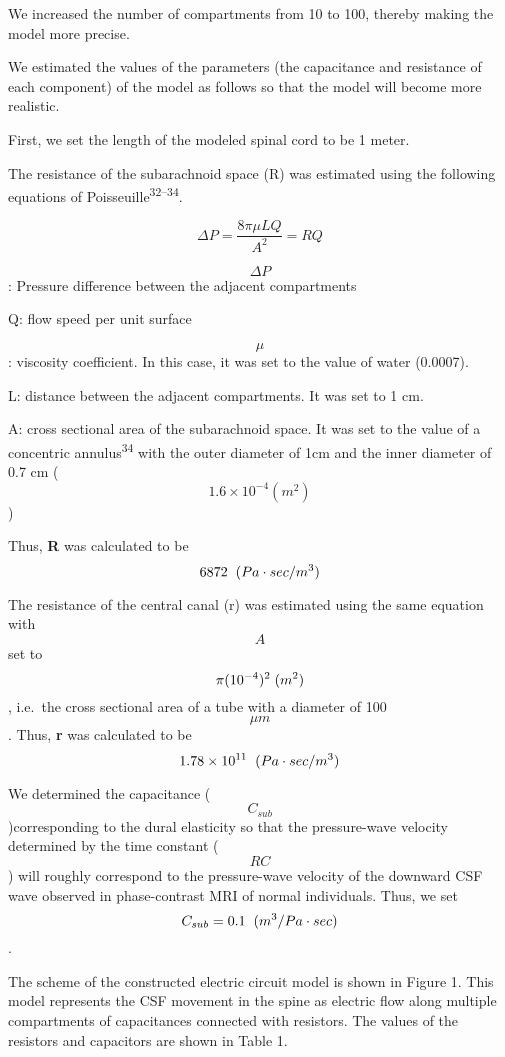 \documentclass[a4paper,12pt]{article}
\begin{document}
We increased the number of compartments from 10 to 100, thereby making the model more precise.

We estimated the values of the parameters (the capacitance and resistance of each component) of the model as follows so that the model will become more realistic.

First, we set the length of the modeled spinal cord to be 1 meter.

The resistance of the subarachnoid space (R) was estimated using the following equations of Poisseuille\textsuperscript{32--34}.

\[\Delta P=\frac{8\pi \mu{}LQ}{A^{2}}=RQ\]

\[\Delta P\]: Pressure difference between the adjacent compartments

Q: flow speed per unit surface

\[\mu\]: viscosity coefficient. In this case, it was set to the value of water (0.0007).

L: distance between the adjacent compartments. It was set to 1 cm.

A: cross sectional area of the subarachnoid space. It was set to the value of a concentric annulus\textsuperscript{34} with the outer diameter of 1cm and the inner diameter of 0.7 cm (\[1.6\times{}10^{-4} (m^2)\])

Thus, \textbf{R} was calculated to be \[6872\hspace{0.2cm}(Pa\cdot{}sec/m^3)\]

The resistance of the central canal (r) was estimated using the same equation with \[A\] set to \[\pi{}(10^{-4})^2\hspace{0.1cm}(m^2)\], i.e.~the cross sectional area of a tube with a diameter of 100 \[\mu{}m\]. Thus, \textbf{r} was calculated to be \[1.78\times10^{11}\hspace{0.2cm}(Pa\cdot{}sec/m^3)\]

We determined the capacitance (\[C_{sub}\])corresponding to the dural elasticity so that the pressure-wave velocity determined by the time constant (\[RC\]) will roughly correspond to the pressure-wave velocity of the downward CSF wave observed in phase-contrast MRI of normal individuals. Thus, we set \[C_{sub}=0.1\hspace{0.2cm}(m^3/Pa\cdot{}sec)\].

The scheme of the constructed electric circuit model is shown in Figure 1. This model represents the CSF movement in the spine as electric flow along multiple compartments of capacitances connected with resistors. The values of the resistors and capacitors are shown in Table 1.
\end{document}
